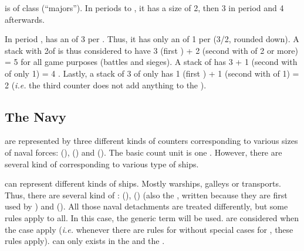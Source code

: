 
\StackArtillery

\begin{exemple}
  \FRA is of class \CAIV (``majors''). In periods  to ,
  it has a size of 2, then 3 in period  and 4 afterwards.

  In period , \FRA has an  of 3 per
  \ARMY\faceplus. Thus, it has only an  of 1 per
  \ARMY\facemoins (3/2, rounded down). A stack with 2\ARMY\faceplus of \FRA is
  thus considered to have 3 (first \ARMY) + 2 (second \ARMY with
   of 2 or more) = 5  for all
  game purposes (battles and sieges). A stack of \ARMY\faceplus
  \ARMY\facemoins has 3 + 1 (second \ARMY with  of only
  1) = 4 . Lastly, a stack of 3 \ARMY\facemoins of \FRA
  only has 1 (first \ARMY) + 1 (second \ARMY with  of
  1) = 2  (\emph{i.e.}  the third \ARMY counter does
  not add anything to the ).
\end{exemple}



\subsection{The Navy}

 are represented by three different kinds of counters
corresponding to various sizes of naval forces:  (\FLEET),
 (\ND) and 
(\NDE).
\bparag The basic count unit is one \ND. However, there are several kind of
\ND corresponding to various type of ships.

 \ND can represent different kinds of
ships. Mostly warships, galleys or transports.
\bparag Thus, there are several kind of \ND: 
(\NWD),  (\NGD) (also the ,
written \VGD because they are first used by \VEN) and  (\NTD).
\bparag All those naval detachments are treated differently, but some rules
apply to all. In this case, the generic term \ND will be used.
\bparag \VGD are considered \NGD when the case apply (\emph{i.e.} whenever
there are rules for \NGD without special cases for \VGD, these rules apply).
\bparag \NGD can only exists in the \regionMediterrannee and the
\regionBaltique.

